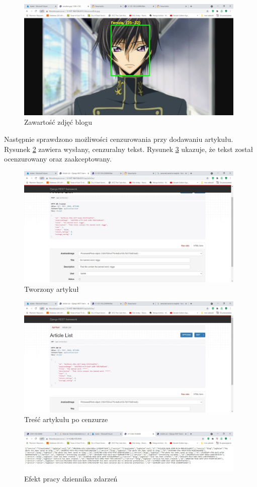 \documentclass[12pt,twoside]{article}
\begin{document}
\begin{figure}[ht]
	\centering
	\includegraphics[width=11cm]{figures/blog.jpg}
	\caption{Zawartość zdjęć blogu}
\label{Fig:blog}
\end{figure}
Następnie sprawdzono możliwości cenzurowania przy dodawaniu artykułu. Rysunek \ref{Fig:blog2} zawiera wysłany, cenzuralny tekst. Rysunek \ref{Fig:blog3} ukazuje, że tekst został ocenzurowany oraz zaakceptowany.
\begin{figure}[ht]
	\centering
	\includegraphics[width=11cm]{figures/blog2.jpg}
	\caption{Tworzony artykuł}
\label{Fig:blog2}
\end{figure}
\begin{figure}[ht]
	\centering
	\includegraphics[width=11cm]{figures/blog3.jpg}
	\caption{Treść artykułu po cenzurze}
\label{Fig:blog3}
\end{figure}
\begin{figure}[ht]
	\centering
	\includegraphics[width=11cm]{figures/logs.jpg}
	\caption{Efekt pracy dziennika zdarzeń}
\label{Fig:logs}
\end{figure}
\end{document}
